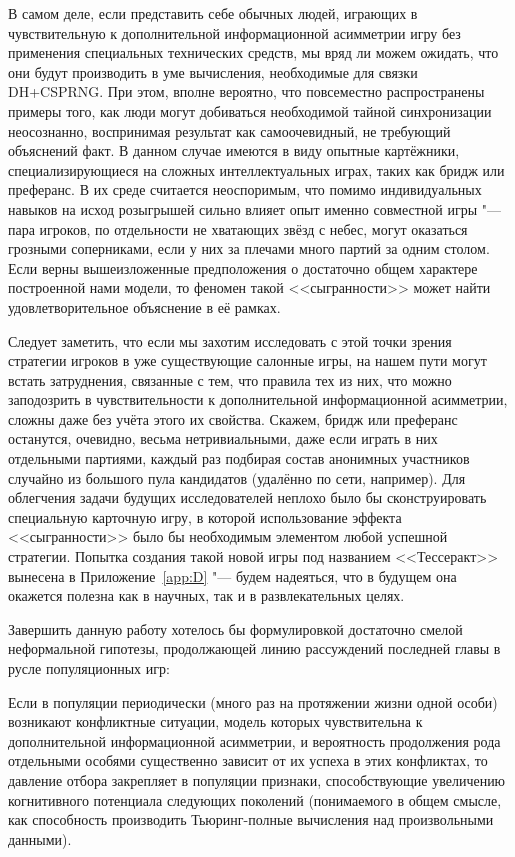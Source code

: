 В самом деле, если представить себе обычных людей, играющих в чувствительную к дополнительной информационной асимметрии игру без применения специальных технических средств, мы вряд ли можем ожидать, что они будут производить в уме вычисления, необходимые для связки DH+CSPRNG. При этом, вполне вероятно, что повсеместно распространены примеры того, как люди могут добиваться необходимой тайной синхронизации неосознанно, воспринимая результат как самоочевидный, не требующий объяснений факт. В данном случае имеются в виду опытные картёжники, специализирующиеся на сложных интеллектуальных играх, таких как бридж или преферанс. В их среде считается неоспоримым, что помимо индивидуальных навыков на исход розыгрышей сильно влияет опыт именно совместной игры "--- пара игроков, по отдельности не хватающих звёзд с небес, могут оказаться грозными соперниками, если у них за плечами много партий за одним столом. Если верны вышеизложенные предположения о достаточно общем характере построенной нами модели, то феномен такой <<сыгранности>> может найти удовлетворительное объяснение в её рамках.

Следует заметить, что если мы захотим исследовать с этой точки зрения стратегии игроков в уже существующие салонные игры, на нашем пути могут встать затруднения, связанные с тем, что правила тех из них, что можно заподозрить в чувствительности к дополнительной информационной асимметрии, сложны даже без учёта этого их свойства. Скажем, бридж или преферанс останутся, очевидно, весьма нетривиальными, даже если играть в них отдельными партиями, каждый раз подбирая состав анонимных участников случайно из большого пула кандидатов (удалённо по сети, например). Для облегчения задачи будущих исследователей неплохо было бы сконструировать специальную карточную игру, в которой использование эффекта <<сыгранности>> было бы необходимым элементом любой успешной стратегии. Попытка создания такой новой игры под названием <<Тессеракт>> вынесена в Приложение~\cref{app:D} "--- будем надеяться, что в будущем она окажется полезна как в научных, так и в развлекательных целях.

Завершить данную работу хотелось бы формулировкой достаточно смелой неформальной гипотезы, продолжающей линию рассуждений последней главы в русле популяционных игр:
\begin{conjecture}
	Если в популяции периодически (много раз на протяжении жизни одной особи) возникают конфликтные ситуации, модель которых чувствительна к дополнительной информационной асимметрии, и вероятность продолжения рода отдельными особями существенно зависит от их успеха в этих конфликтах, то давление отбора закрепляет в популяции признаки, способствующие увеличению когнитивного потенциала следующих поколений (понимаемого в общем смысле, как способность производить Тьюринг-полные вычисления над произвольными данными).
\end{conjecture}

